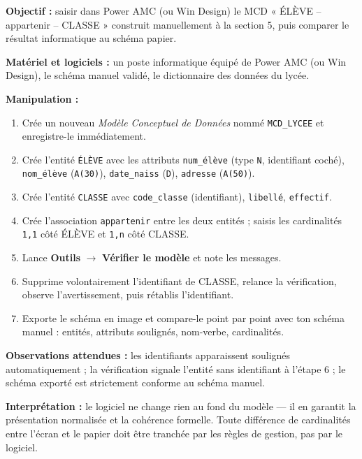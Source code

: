 \documentclass[11pt]{article}
\begin{document}
\begin{experience}
\textbf{Objectif :} saisir dans Power AMC (ou Win Design) le MCD « ÉLÈVE -- appartenir -- CLASSE » construit manuellement à la section 5, puis comparer le résultat informatique au schéma papier.

\textbf{Matériel et logiciels :} un poste informatique équipé de Power AMC (ou Win Design), le schéma manuel validé, le dictionnaire des données du lycée.

\textbf{Manipulation :}
\begin{enumerate}
\item Crée un nouveau \emph{Modèle Conceptuel de Données} nommé \texttt{MCD\_LYCEE} et enregistre-le immédiatement.
\item Crée l'entité \texttt{ÉLÈVE} avec les attributs \texttt{num\_élève} (type \texttt{N}, identifiant coché), \texttt{nom\_élève} (\texttt{A(30)}), \texttt{date\_naiss} (\texttt{D}), \texttt{adresse} (\texttt{A(50)}).
\item Crée l'entité \texttt{CLASSE} avec \texttt{code\_classe} (identifiant), \texttt{libellé}, \texttt{effectif}.
\item Crée l'association \texttt{appartenir} entre les deux entités ; saisis les cardinalités \texttt{1,1} côté ÉLÈVE et \texttt{1,n} côté CLASSE.
\item Lance \textbf{Outils} $\rightarrow$ \textbf{Vérifier le modèle} et note les messages.
\item Supprime volontairement l'identifiant de CLASSE, relance la vérification, observe l'avertissement, puis rétablis l'identifiant.
\item Exporte le schéma en image et compare-le point par point avec ton schéma manuel : entités, attributs soulignés, nom-verbe, cardinalités.
\end{enumerate}

\textbf{Observations attendues :} les identifiants apparaissent soulignés automatiquement ; la vérification signale l'entité sans identifiant à l'étape 6 ; le schéma exporté est strictement conforme au schéma manuel.

\textbf{Interprétation :} le logiciel ne change rien au fond du modèle — il en garantit la présentation normalisée et la cohérence formelle. Toute différence de cardinalités entre l'écran et le papier doit être tranchée par les règles de gestion, pas par le logiciel.
\end{experience}
\end{document}
